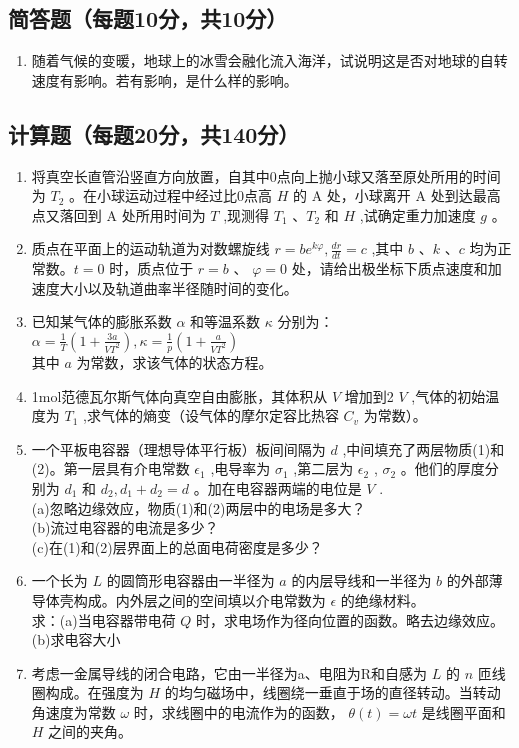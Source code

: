 
\subsection{简答题（每题10分，共10分）}
\begin{enumerate}
\item 随着气候的变暖，地球上的冰雪会融化流入海洋，试说明这是否对地球的自转速度有影响。若有影响，是什么样的影响。
\end{enumerate}
\subsection{计算题（每题20分，共140分）}
\begin{enumerate}
\item 将真空长直管沿竖直方向放置，自其中0点向上抛小球又落至原处所用的时间为 $T_2$ 。在小球运动过程中经过比0点高 $H$ 的 $\mathrm A$ 处，小球离开 $\mathrm A$ 处到达最高点又落回到 $\mathrm A$ 处所用时间为 $T$ ,现测得 $T_1$ 、$T_2$ 和 $H$ ,试确定重力加速度 $g$ 。
\item 质点在平面上的运动轨道为对数螺旋线 $r=be^{k\varphi},\frac{dr}{dt}=c$ ,其中 $b$ 、$k$ 、$c$ 均为正常数。$t=0$ 时，质点位于 $r=b$ 、 $\varphi=0$ 处，请给出极坐标下质点速度和加速度大小以及轨道曲率半径随时间的变化。
\item 已知某气体的膨胀系数 $\alpha$ 和等温系数 $\kappa$ 分别为：\\
 $\alpha=\frac{1}{T}(1+\frac{3a}{VT^2}),\kappa=\frac{1}{p}(1+\frac{a}{VT^2})$ \\
其中 $a$ 为常数，求该气体的状态方程。

\item 1mol范德瓦尔斯气体向真空自由膨胀，其体积从 $V$ 增加到2 $V$ ,气体的初始温度为 $T_1$ ,求气体的熵变（设气体的摩尔定容比热容 $C_v$ 为常数）。
\item 一个平板电容器（理想导体平行板）板间间隔为 $d$ ,中间填充了两层物质(1)和(2)。第一层具有介电常数 $\epsilon_1$ ,电导率为 $\sigma_1$ ,第二层为 $\epsilon_2$ , $\sigma_2$ 。他们的厚度分别为 $d_1$ 和 $d_2,d_1+d_2=d$ 。加在电容器两端的电位是 $V$ .\\
(a)忽略边缘效应，物质(1)和(2)两层中的电场是多大？\\
(b)流过电容器的电流是多少？\\
(c)在(1)和(2)层界面上的总面电荷密度是多少？\\
\item 一个长为 $L$ 的圆筒形电容器由一半径为 $a$ 的内层导线和一半径为 $b$ 的外部薄导体壳构成。内外层之间的空间填以介电常数为 $\epsilon$ 的绝缘材料。\\
求：(a)当电容器带电荷 $Q$ 时，求电场作为径向位置的函数。略去边缘效应。\\
(b)求电容大小
\item 考虑一金属导线的闭合电路，它由一半径为a、电阻为R和自感为 $L$ 的 $n$ 匝线圈构成。在强度为 $H$ 的均匀磁场中，线圈绕一垂直于场的直径转动。当转动角速度为常数 $\omega$ 时，求线圈中的电流作为的函数， $\theta (t)=\omega t$ 是线圈平面和 $H$ 之间的夹角。

\end{enumerate}